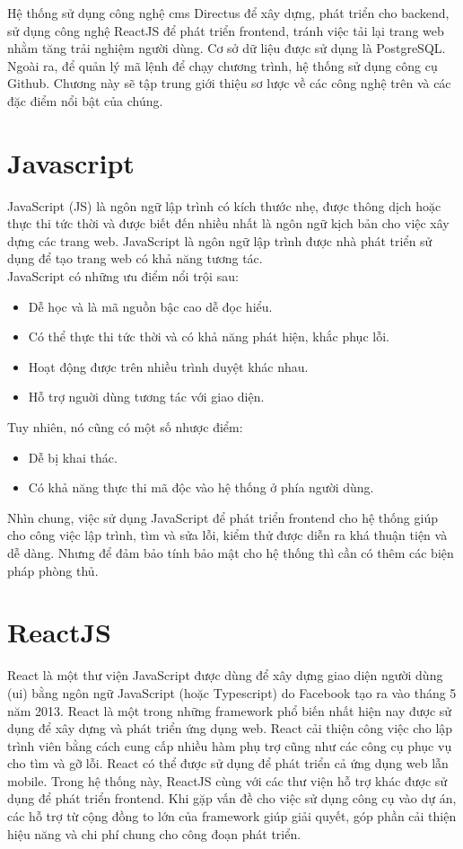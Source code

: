 \documentclass[./../main.tex]{subfiles}
\begin{document}
Hệ thống sử dụng công nghệ \acrshort{cms} Directus để xây dựng, phát triển cho backend, sử dụng công nghệ ReactJS để phát triển frontend, tránh việc tải lại trang web nhằm tăng trải nghiệm người dùng. Cơ sở dữ liệu được sử dụng là PostgreSQL. Ngoài ra, để quản lý mã lệnh để chạy chương trình, hệ thống sử dụng công cụ Github. Chương này sẽ tập trung giới thiệu sơ lược về các công nghệ trên và các đặc điểm nổi bật của chúng.

\section{Javascript}
JavaScript (JS) là ngôn ngữ lập trình có kích thước nhẹ, được thông dịch hoặc thực thi tức thời và được biết đến nhiều nhất là ngôn ngữ kịch bản cho việc xây dựng các trang web. JavaScript là ngôn ngữ lập trình được nhà phát triển sử dụng để tạo trang web có khả năng tương tác.\\
JavaScript có những ưu điểm nổi trội sau:
\begin{itemize}
    \item Dễ học và là mã nguồn bậc cao dễ đọc hiểu.
    \item Có thể thực thi tức thời và có khả năng phát hiện, khắc phục lỗi.
    \item Hoạt động được trên nhiều trình duyệt khác nhau.
    \item Hỗ trợ nguời dùng tương tác với giao diện.
\end{itemize}
Tuy nhiên, nó cũng có một số nhược điểm:
\begin{itemize}
    \item Dễ bị khai thác.
    \item Có khả năng thực thi mã độc vào hệ thống ở phía người dùng.
\end{itemize}
Nhìn chung, việc sử dụng JavaScript để phát triển frontend cho hệ thống giúp cho công việc lập trình, tìm và sửa lỗi, kiểm thử được diễn ra khá thuận tiện và dễ dàng. Nhưng để đảm bảo tính bảo mật cho hệ thống thì cần có thêm các biện pháp phòng thủ.

\section{ReactJS}
React \cite{react} là một thư viện JavaScript được dùng để xây dựng giao diện người dùng (\acrshort{ui}) bằng ngôn ngữ JavaScript (hoặc Typescript) do Facebook tạo ra vào tháng 5 năm 2013. React là một trong những framework phổ biến nhất hiện nay được sử dụng để xây dựng và phát triển ứng dụng web. React cải thiện công việc cho lập trình viên bằng cách cung cấp nhiều hàm phụ trợ cũng như các công cụ phục vụ cho tìm và gỡ lỗi. React có thể được sử dụng để phát triển cả ứng dụng web lẫn mobile. Trong hệ thống này, ReactJS cùng với các thư viện hỗ trợ khác được sử dụng để phát triển frontend. Khi gặp vấn đề cho việc sử dụng công cụ vào dự án, các hỗ trợ từ cộng đồng to lớn của framework giúp giải quyết, góp phần cải thiện hiệu năng và chi phí chung cho công đoạn phát triển.
\end{document}
